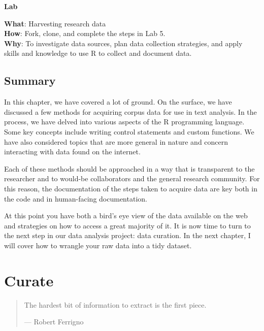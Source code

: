 \documentclass[
  letterpaper,
]{latex/krantz}
\theoremstyle{definition}
\theoremstyle{remark}
\begin{document}
\begin{tcolorbox}[enhanced jigsaw, bottomrule=.15mm, leftrule=.75mm, toprule=.15mm, breakable, colframe=quarto-callout-color-frame, arc=.35mm, left=2mm, rightrule=.15mm, opacityback=0, colback=white]

\textbf{ Lab}

\textbf{What}: Harvesting research data\\
\textbf{How}: Fork, clone, and complete the steps in Lab 5.\\
\textbf{Why}: To investigate data sources, plan data collection
strategies, and apply skills and knowledge to use R to collect and
document data.

\end{tcolorbox}

\section*{Summary}\label{summary-4}


In this chapter, we have covered a lot of ground. On the surface, we
have discussed a few methods for acquiring corpus data for use in text
analysis. In the process, we have delved into various aspects of the R
programming language. Some key concepts include writing control
statements and custom functions. We have also considered topics that are
more general in nature and concern interacting with data found on the
internet.

Each of these methods should be approached in a way that is transparent
to the researcher and to would-be collaborators and the general research
community. For this reason, the documentation of the steps taken to
acquire data are key both in the code and in human-facing documentation.

At this point you have both a bird's eye view of the data available on
the web and strategies on how to access a great majority of it. It is
now time to turn to the next step in our data analysis project: data
curation. In the next chapter, I will cover how to wrangle your raw data
into a tidy dataset.

\chapter{Curate}\label{sec-curate-chapter}

\begin{quote}
The hardest bit of information to extract is the first piece.

--- Robert Ferrigno
\end{quote}
\end{document}
